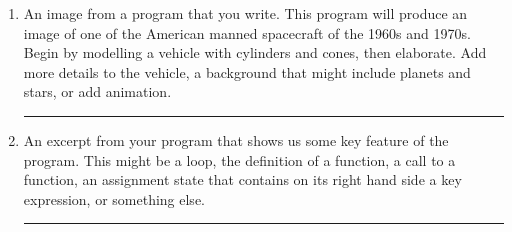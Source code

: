\documentclass[oneside]{article}
\newenvironment{answer}
  {\vspace*{0.2cm} \rule{12cm}{0.02cm} \vspace*{0.2cm}}
  {\vspace*{0.2cm}}
\begin{document}
\begin{enumerate}
	\item An image from a program that you write. This program will produce an image of one of the American manned spacecraft of the 1960s and 1970s. Begin by modelling a vehicle with cylinders and cones, then elaborate. Add more details to the vehicle, a background that might include planets and stars, or add animation.

	      \begin{answer}

	      \end{answer}

	\item An excerpt from your program that shows us some key feature of the program. This might be a loop, the definition of a function, a call to a function, an assignment state that contains on its right hand side a key expression, or something else.

	      \begin{answer}

	      \end{answer}

\end{enumerate}
\end{document}

